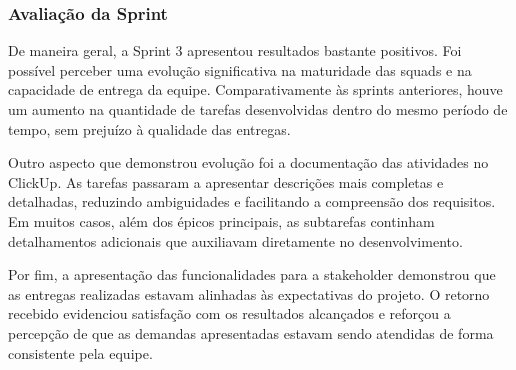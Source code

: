 \subsubsection*{Avaliação da Sprint}

De maneira geral, a Sprint 3 apresentou resultados bastante positivos. Foi possível
perceber uma evolução significativa na maturidade das squads e na capacidade de entrega
da equipe. Comparativamente às sprints anteriores, houve um aumento na quantidade de
tarefas desenvolvidas dentro do mesmo período de tempo, sem prejuízo à qualidade das
entregas.

Outro aspecto que demonstrou evolução foi a documentação das atividades no ClickUp.
As tarefas passaram a apresentar descrições mais completas e detalhadas, reduzindo
ambiguidades e facilitando a compreensão dos requisitos. Em muitos casos, além dos
épicos principais, as subtarefas continham detalhamentos adicionais que auxiliavam
diretamente no desenvolvimento.

Por fim, a apresentação das funcionalidades para a stakeholder demonstrou que as
entregas realizadas estavam alinhadas às expectativas do projeto. O retorno recebido
evidenciou satisfação com os resultados alcançados e reforçou a percepção de que as
demandas apresentadas estavam sendo atendidas de forma consistente pela equipe.

